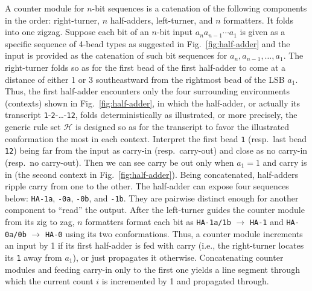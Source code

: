 A counter module for $n$-bit sequences is a catenation of the following components in the order: right-turner, $n$ half-adders, left-turner, and $n$ formatters. 
It folds into one zigzag. 
Suppose each bit of an $n$-bit input $a_n a_{n-1} \cdots a_1$ is given as a specific sequence of 4-bead types as suggested in Fig.~\ref{fig:half-adder} and the input is provided as the catenation of such bit sequences for $a_n, a_{n-1}, \ldots, a_1$. 
The right-turner folds so as for the first bead of the first half-adder to come at a distance of either 1 or 3 southeastward from the rightmost bead of the LSB $a_1$. 
Thus, the first half-adder encounters only the four surrounding environments (contexts) shown in Fig.~\ref{fig:half-adder}, in which the half-adder, or actually its transcript {\tt 1}-{\tt 2}-\dots-{\tt 12}, folds deterministically as illustrated, or more precisely, the generic rule set $\mathcal{H}$ is designed so as for the transcript to favor the illustrated conformation the most in each context. 
Interpret the first bead {\tt 1} (resp.~last bead {\tt 12}) being far from the input as carry-in (resp.~carry-out) and close as no carry-in (resp.~no carry-out). 
Then we can see carry be out only when $a_1 = 1$ and carry is in (the second context in Fig.~\ref{fig:half-adder}). 
Being concatenated, half-adders ripple carry from one to the other. 
The half-adder can expose four sequences below: {\tt HA-1a}, {\tt -0a}, {\tt -0b}, and {\tt -1b}. 
They are pairwise distinct enough for another component to ``read'' the output. 
After the left-turner guides the counter module from its zig to zag, $n$ formatters format each bit as {\tt HA-1a/1b} $\to$ {\tt HA-1} and {\tt HA-0a/0b} $\to$ {\tt HA-0} using its two conformations. 
Thus, a counter module increments an input by 1 if its first half-adder is fed with carry (i.e., the right-turner locates its {\tt 1} away from $a_1$), or just propagates it otherwise. 
Concatenating counter modules and feeding carry-in only to the first one yields a line segment through which the current count $i$ is incremented by 1 and propagated through. 

